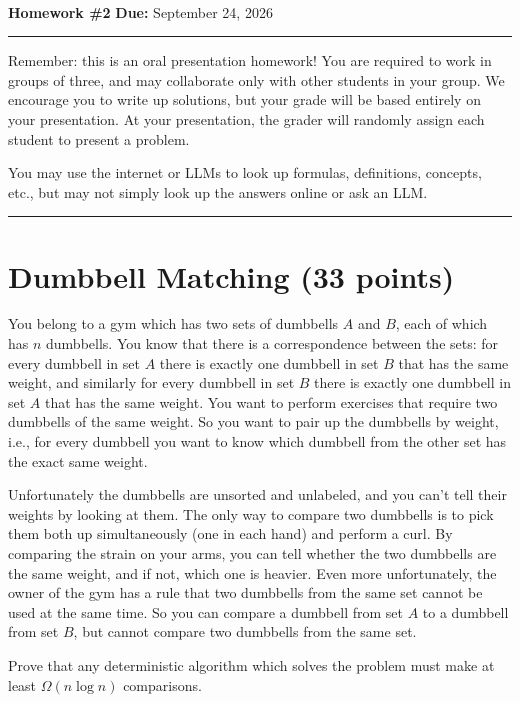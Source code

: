 \documentclass[11pt]{article}
\begin{document}
\\
{{\bf Homework \#2}} \hfill {{\bf Due:} September 24, 2026} \\
\rule[0.1in]{\textwidth}{0.4pt}

Remember: this is an oral presentation homework!  You are required to work in groups of three, and may collaborate only with other students in your group.  We encourage you to write up solutions, but your grade will be based entirely on your presentation.  At your presentation, the grader will randomly assign each student to present a problem. 

You may use the internet or LLMs to look up formulas, definitions, concepts, etc., but may not simply look up the answers online or ask an LLM.  


\noindent \rule[0.1in]{\textwidth}{0.4pt}

\section{Dumbbell Matching (33 points)}
You belong to a gym which has two sets of dumbbells $A$ and $B$, each of which has $n$ dumbbells.  You know that there is a correspondence between the sets: for every dumbbell in set $A$ there is exactly one dumbbell in set $B$ that has the same weight, and similarly for every dumbbell in set $B$ there is exactly one dumbbell in set $A$ that has the same weight.  You want to perform exercises that require two dumbbells of the same weight.  So you want to pair up the dumbbells by weight, i.e., for every dumbbell you want to know which dumbbell from the other set has the exact same weight.

Unfortunately the dumbbells are unsorted and unlabeled, and you can't tell their weights by looking at them. The only way to compare two dumbbells is to pick them both up simultaneously (one in each hand) and perform a curl.  By comparing the strain on your arms, you can tell whether the two dumbbells are the same weight, and if not, which one is heavier.  Even more unfortunately, the owner of the gym has a rule that two dumbbells from the same set cannot be used at the same time.  So you can compare a dumbbell from set $A$ to a dumbbell from set $B$, but cannot compare two dumbbells from the same set.  

Prove that any deterministic algorithm which solves the problem must make at least $\Omega(n \log n)$ comparisons.
\end{document}
